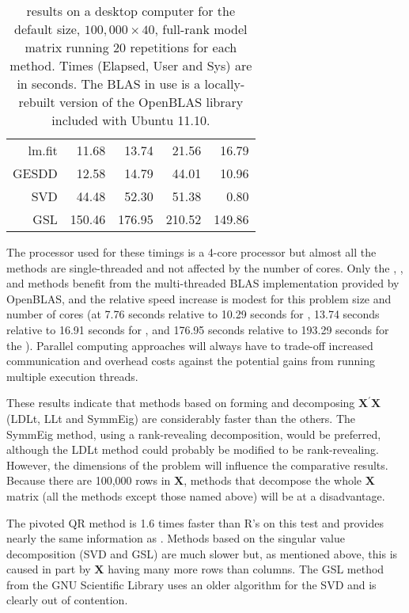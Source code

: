 \documentclass[shortnames,article,nojss]{jss}
\begin{document}
\begin{table}[tb]
\begin{tabular}{r r r r r}
   lm.fit &   11.68 &   13.74 &     21.56 &    16.79 \\
    GESDD &   12.58 &   14.79 &     44.01 &    10.96 \\
      SVD &   44.48 &   52.30 &     51.38 &     0.80 \\
      GSL &  150.46 &  176.95 &    210.52 &   149.86 \\
     \bottomrule
  \end{tabular}
  \caption{ results on a desktop computer for the
    default size, $100,000\times 40$, full-rank model matrix running
    20 repetitions for each method.  Times (Elapsed, User and Sys) are
    in seconds.  The BLAS in use is a locally-rebuilt version of the 
    OpenBLAS library included with Ubuntu 11.10.}
  \label{tab:lmRes}
\end{table}
The processor used for these timings is a 4-core processor but almost all the
methods are single-threaded and not affected by the number of cores.  Only
the , ,  and  methods benefit from the
multi-threaded BLAS implementation provided by OpenBLAS, and the relative
speed increase is modest for this problem size and number of cores (at 7.76
seconds relative to 10.29 seconds for , 13.74 seconds relative to
16.91 seconds for , and 176.95 seconds relative to 193.29
seconds for the ). Parallel computing approaches will always have
to trade-off increased communication and overhead costs against the potential
gains from running multiple execution threads. %

These results indicate that methods based on forming and decomposing
$\bm X^\prime\bm X$ (LDLt, LLt and SymmEig) are considerably
faster than the others.  The SymmEig method, using a rank-revealing
decomposition, would be preferred, although the LDLt method could
probably be modified to be rank-revealing.  However, the
dimensions of the problem will influence the comparative results.
Because there are 100,000 rows in $\bm X$, methods that decompose the
whole $\bm X$ matrix (all the methods except those named above) will
be at a disadvantage.

The pivoted QR method is 1.6 times faster than R's  on
this test and provides nearly the same information as .
Methods based on the singular value decomposition (SVD and GSL) are
much slower but, as mentioned above, this is caused in part by $\bm X$
having many more rows than columns.  The GSL method from the GNU
Scientific Library uses an older algorithm for the SVD and is clearly
out of contention.
\end{document}
